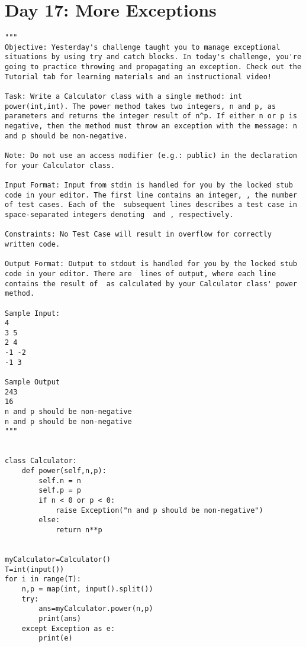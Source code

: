 \documentclass[11pt,a4paper]{article}
\begin{document}
\section{Day 17: More Exceptions}
\begin{lstlisting}
"""
Objective: Yesterday's challenge taught you to manage exceptional situations by using try and catch blocks. In today's challenge, you're going to practice throwing and propagating an exception. Check out the Tutorial tab for learning materials and an instructional video!

Task: Write a Calculator class with a single method: int power(int,int). The power method takes two integers, n and p, as parameters and returns the integer result of n^p. If either n or p is negative, then the method must throw an exception with the message: n and p should be non-negative.

Note: Do not use an access modifier (e.g.: public) in the declaration for your Calculator class.

Input Format: Input from stdin is handled for you by the locked stub code in your editor. The first line contains an integer, , the number of test cases. Each of the  subsequent lines describes a test case in  space-separated integers denoting  and , respectively.

Constraints: No Test Case will result in overflow for correctly written code.

Output Format: Output to stdout is handled for you by the locked stub code in your editor. There are  lines of output, where each line contains the result of  as calculated by your Calculator class' power method.

Sample Input:
4
3 5
2 4
-1 -2
-1 3

Sample Output
243
16
n and p should be non-negative
n and p should be non-negative
"""


class Calculator:
    def power(self,n,p):
        self.n = n
        self.p = p
        if n < 0 or p < 0:
            raise Exception("n and p should be non-negative")
        else:
            return n**p


myCalculator=Calculator()
T=int(input())
for i in range(T):
    n,p = map(int, input().split())
    try:
        ans=myCalculator.power(n,p)
        print(ans)
    except Exception as e:
        print(e) 
\end{lstlisting}


\newpage
\end{document}

